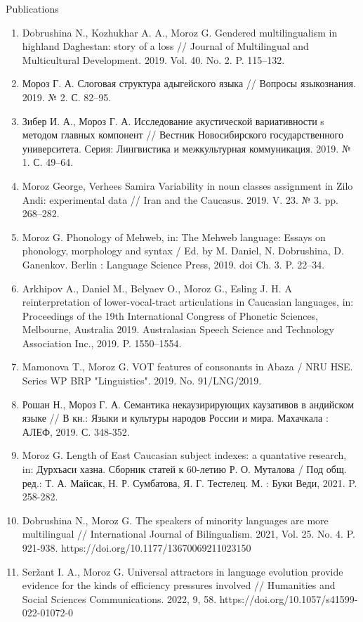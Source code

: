 \documentclass{resume} %
\begin{document}
\begin{rSection}{Publications}
\begin{enumerate}
\item  Dobrushina N., Kozhukhar A. A., Moroz G. Gendered multilingualism in highland Daghestan: story of a loss // Journal of Multilingual and Multicultural Development. 2019. Vol. 40. No. 2. P. 115--132.
\item Мороз Г. А. Слоговая структура адыгейского языка // Вопросы языкознания. 2019. № 2. С. 82--95.
\item  Зибер И. А., Мороз Г. А. Исследование акустической вариативности s методом главных компонент // Вестник Новосибирского государственного университета. Серия: Лингвистика и межкультурная коммуникация. 2019. № 1. С. 49--64.
\item Moroz George, Verhees Samira Variability in noun classes assignment in Zilo Andi: experimental data // Iran and the Caucasus. 2019. V. 23. № 3. pp. 268--282.
\item  Moroz G. Phonology of Mehweb, in: The Mehweb language: Essays on phonology, morphology and syntax / Ed. by M. Daniel, N. Dobrushina, D. Ganenkov. Berlin : Language Science Press, 2019. doi Ch. 3. P. 22--34.
\item Arkhipov A., Daniel M., Belyaev O., Moroz G., Esling J. H. A reinterpretation of lower-vocal-tract articulations in Caucasian languages, in: Proceedings of the 19th International Congress of Phonetic Sciences, Melbourne, Australia 2019. Australasian Speech Science and Technology Association Inc., 2019. P. 1550--1554.
\item Mamonova T., Moroz G. VOT features of consonants in Abaza / NRU HSE. Series WP BRP "Linguistics". 2019. No. 91/LNG/2019.
\item Рошан Н., Мороз Г. А. Семантика некаузирирующих каузативов в андийском языке // В кн.: Языки и культуры народов России и мира. Махачкала : АЛЕФ, 2019. С. 348-352.
\item Moroz G. Length of East Caucasian subject indexes: a quantative research, in: Дурхъаси хазна. Сборник статей к 60-летию Р. О. Муталова / Под общ. ред.: Т. А. Майсак, Н. Р. Сумбатова, Я. Г. Тестелец. М. : Буки Веди, 2021. P. 258-282.
\item Dobrushina N., Moroz G. The speakers of minority languages are more multilingual // International Journal of Bilingualism. 2021, Vol. 25. No. 4. P. 921-938. https://doi.org/10.1177/13670069211023150
\item Seržant I. A., Moroz G. Universal attractors in language evolution provide evidence for the kinds of efficiency pressures involved // Humanities and Social Sciences Communications. 2022, 9, 58. https://doi.org/10.1057/s41599-022-01072-0

\end{enumerate}
\end{rSection}
\end{document}
